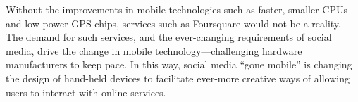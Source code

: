 \documentclass[a4paper,11pt]{article}
\begin{document}
    Without the improvements in mobile technologies such as faster, smaller
    CPUs and low-power GPS chips, services such as Foursquare would not be
    a reality. The demand for such services, and the ever-changing requirements
    of social media, drive the change in mobile technology---challenging
    hardware manufacturers to keep pace. In this way, social media ``gone
    mobile'' is changing the design of hand-held devices to facilitate
    ever-more creative ways of allowing users to interact with online services.

    
    
\end{document}
